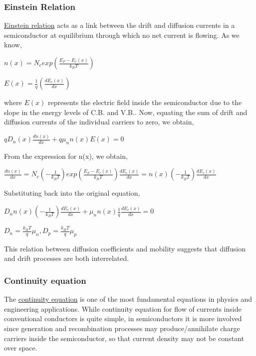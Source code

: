\documentclass[12 pt]{article}
\begin{document}
\subsubsection{Einstein Relation}

\href{https://en.wikipedia.org/wiki/Einstein_relation_(kinetic_theory)}{Einstein relation} acts as a link between the drift and diffusion currents in a semiconductor at equilibrium through which no net current is flowing. As we know,
\begin{center}
    $ n(x) = N_{c} exp(\frac{E_{F}-E_{c}(x)}{k_{B}T})  $
\end{center}
\begin{center}
    $ E(x) = \frac{1}{q}(\frac{dE_{c}(x)}{dx}) $
\end{center}
where $E(x)$ represents the electric field inside the semiconductor due to the slope in the energy levels of C.B. and V.B.. Now, equating the sum of drift and diffusion currents of the individual carriers to zero, we obtain,
\begin{center}
    $  qD_{n}(x)\frac{dn(x)}{dx} + q\mu_{n} n(x)E(x) = 0  $
\end{center}
From the expression for n(x), we obtain,
\begin{center}
    $  \frac{dn(x)}{dx} = N_{c}(-\frac{1}{k_{B}T})exp(\frac{E_{F}-E_{c}(x)}{k_{B}T})\frac{dE_{c}(x)}{dx} = n(x)(-\frac{1}{k_{B}T})\frac{dE_{c}(x)}{dx}  $
\end{center}
Substituting back into the original equation,
\begin{center}
    $ D_{n}n(x)(-\frac{1}{k_{B}T})\frac{dE_{c}(x)}{dx} + \mu_{n} n(x)\frac{1}{q}\frac{dE_{c}(x)}{dx} = 0  $
\end{center}
\begin{center}
 $ D_{n} = \frac{k_{B}T}{q}\mu_{n} , D_{p} = \frac{k_{B}T}{q}\mu_{p}  $
\end{center}
This relation between diffusion coefficients and mobility suggests that diffusion and drift processes are both interrelated.

\subsubsection{Continuity equation}
The \href{https://en.wikipedia.org/wiki/Continuity_equation}{continuity equation} is one of the most fundamental equations in physics and engineering applications. While continuity equation for flow of currents inside conventional conductors is quite simple, in semiconductors it is more involved since generation and recombination processes may produce/annihilate charge carriers inside the semiconductor, so that current density may not be constant over space.\par
\end{document}
